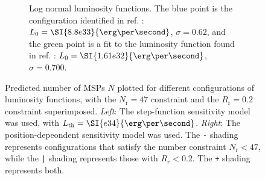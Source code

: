 \documentclass{C://Aliases//Dropbox-MIT//Latex_Templates//personal}
\begin{document}
\begin{figure}
\begin{subfigure}[t]{\textwidth}
        \caption{Log normal luminosity functions. The blue point is the configuration identified in ref. \cite{osti_1305131}: $L_0=\SI{8.8e33}{\erg\per\second}$, $\sigma=0.62$, and the green point is a fit to the luminosity function found in ref. \cite{Ploeg:2020jeh}: $L_0=\SI{1.61e32}{\erg\per\second}$, $\sigma=0.700$.}
    \end{subfigure}
    \caption{Predicted number of MSPs $N$ plotted for different configurations of luminosity functions, with the $N_\text{r}=47$ constraint and the $R_\text{r}=0.2$ constraint  superimposed. \textit{Left}: The step-function sensitivity model was used, with $L_\text{th} = \SI{e34}{\erg\per\second}$. \textit{Right}: The position-depeondent sensitivity model was used. The \texttt{-} shading represents configurations that satisfy the number constraint $N_\text{r} < 47$, while the \texttt{|} shading represents those with $R_r < 0.2$. The \texttt{+} shading represents both.}
    \label{fig:contours}
\end{figure}
\end{document}
